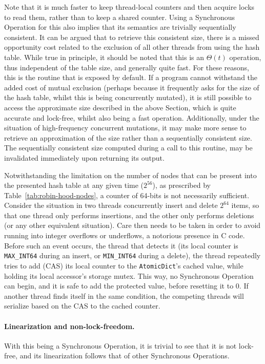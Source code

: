 Note that it is much faster to keep thread-local counters and then acquire locks to read them, rather than to keep a shared counter.
Using a Synchronous Operation for this also implies that its semantics are trivially sequentially consistent.
It can be argued that to retrieve this consistent size, there is a missed opportunity cost related to the exclusion of all other threads from using the hash table.
While true in principle, it should be noted that this is an $\Theta(t)$ operation, thus independent of the table size, and generally quite fast.
For these reasons, this is the routine that is exposed by default.
If a program cannot withstand the added cost of mutual exclusion (perhaps because it frequently asks for the size of the hash table, whilst this is being concurrently mutated), it is still possible to access the approximate size described in the above Section, which is quite accurate and lock-free, whilst also being a fast operation.
Additionally, under the situation of high-frequency concurrent mutations, it may make more sense to retrieve an approximation of the size rather than a sequentially consistent size.
The sequentially consistent size computed during a call to this routine, may be invalidated immediately upon returning its output.

Notwithstanding the limitation on the number of nodes that can be present into the presented hash table at any given time ($2^{56}$), as prescribed by Table~\ref{tab:robin-hood-nodes}, a counter of 64-bits is not necessarily sufficient.
Consider the situation in two threads concurrently insert and delete $2^{64}$ items, so that one thread only performs insertions, and the other only performs deletions (or any other equivalent situation).
Care then needs to be taken in order to avoid running into integer overflows or underflows, a notorious presence in C code.
Before such an event occurs, the thread that detects it (its local counter is \texttt{MAX\_INT64} during an insert, or \texttt{MIN\_INT64} during a delete), the thread repeatedly tries to add (CAS) its local counter to the \texttt{AtomicDict}'s cached value, while holding its local accessor's storage mutex.
This way, no Synchronous Operation can begin, and it is safe to add the protected value, before resetting it to 0.
If another thread finds itself in the same condition, the competing threads will serialize based on the CAS to the cached counter.

\paragraph{Linearization and non-lock-freedom.}
With this being a Synchronous Operation, it is trivial to see that it is not lock-free, and its linearization follows that of other Synchronous Operations.


